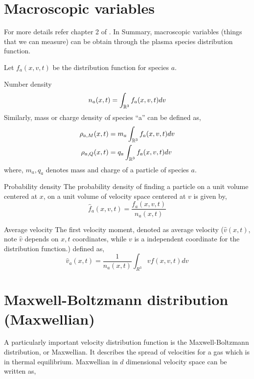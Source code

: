 \documentclass{article}
\begin{document}
\section{Macroscopic variables}
\label{sec:plasma_macroscopic_vars}

For more details refer chapter 2 of \cite{howard}. In Summary, macroscopic variables (things that we can measure) can be obtain through the plasma species distribution function. 

Let $f_a(x,v,t)$ be the distribution function for species $a$. 
\begin{definition}{Number density}
    \begin{equation}
        n_a(x,t) = \int_{\mathbb{R}^3} f_a(x,v,t) dv 
    \end{equation}
Similarly, mass or charge density of species ``a'' can be defined as, 
\begin{align}
    \rho_{a,M}(x,t)   &= m_a \int_{\mathbb{R}^3} f_a(x,v,t) dv \\
    \rho_{a,Q}(x,t) &= q_a \int_{\mathbb{R}^3} f_a(x,v,t) dv 
\end{align} where, $m_a,q_a$ denotes mass and charge of a particle of species $a$. 
\end{definition}

\begin{definition}{Probability density}
    The probability density of finding a particle on a unit volume centered at $x$, on a unit volume of velocity space centered at $v$ is given by, 
    \begin{equation}
        \hat{f}_a(x,v,t) = \frac{f_a(x,v,t)}{n_a(x,t)}
    \end{equation}
\end{definition}

\begin{definition}{Average velocity}
    The first velocity moment, denoted as average velocity ($\hat{v}(x,t)$, note $\hat{v}$ depends on $x,t$ coordinates, while $v$ is a independent coordinate for the distribution function.) defined as, 
    \begin{equation}
        \hat{v}_a(x,t) = \frac{1}{n_a(x,t)} \int_{R^3} v f(x,v,t) dv
    \end{equation}
\end{definition}


\section{Maxwell-Boltzmann distribution (Maxwellian)}
\label{sec:maxwellian}
A particularly important velocity distribution function is the Maxwell-Boltzmann distribution, or Maxwellian. It describes the spread of velocities for a gas which is in thermal equilibrium. Maxwellian in $d$ dimensional velocity space can be written as, 
\end{document}
